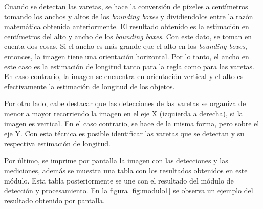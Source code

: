 Cuando se detectan las varetas, se hace la conversión de píxeles a centímetros tomando los anchos y altos de los \textit{bounding boxes} y dividiendolos entre la razón matemática obtenida anteriormente. El resultado obtenido es la estimación en centímetros del alto y ancho de los \textit{bounding boxes}. Con este dato, se toman en cuenta dos cosas. Si el ancho es más grande que el alto en los \textit{bounding boxes}, entonces, la imagen tiene una orientación horizontal. Por lo tanto, el ancho en este caso es la estimación de longitud tanto para la regla como para las varetas. En caso contrario, la imagen se encuentra en orientación vertical y el alto es efectivamente la estimación de longitud de los objetos.

Por otro lado, cabe destacar que las detecciones de las varetas se organiza de menor a mayor recorriendo la imagen en el eje X (izquierda a derecha), si la imagen es vertical. En el caso contrario, se hace de la misma forma, pero sobre el eje Y. Con esta técnica es posible identificar las varetas que se detectan y su respectiva estimación de longitud.

Por último, se imprime por pantalla la imagen con las detecciones y las mediciones, además se muestra una tabla con los resultados obtenidos en este módulo. Esta tabla posteriormente se une con el resultado del módulo de detección y procesamiento. En la figura \ref{fig:modulo1} se observa un ejemplo del resultado obtenido por pantalla.


